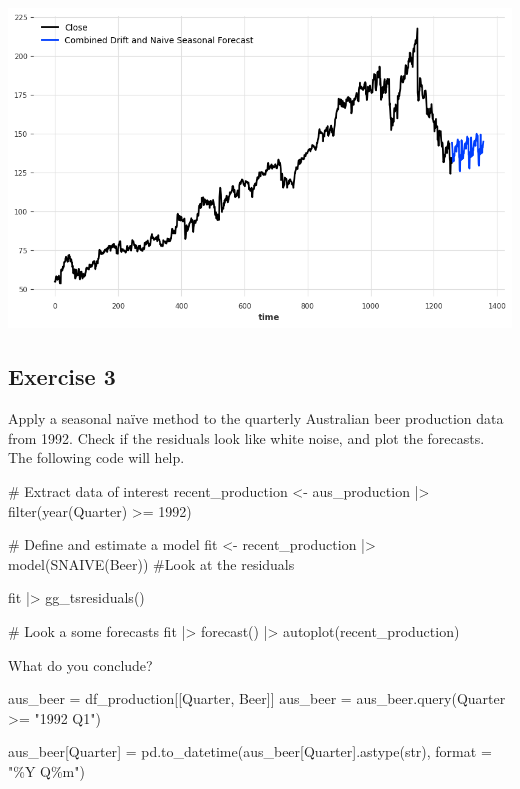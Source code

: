 \documentclass[
  11pt,
]{article}
\newenvironment{Shaded}{\begin{snugshade}}{\end{snugshade}}
\newcommand{\BuiltInTok}[1]{\textcolor[rgb]{0.00,0.23,0.31}{#1}}
\newcommand{\NormalTok}[1]{\textcolor[rgb]{0.00,0.23,0.31}{#1}}
\newcommand{\OperatorTok}[1]{\textcolor[rgb]{0.37,0.37,0.37}{#1}}
\newcommand{\StringTok}[1]{\textcolor[rgb]{0.13,0.47,0.30}{#1}}
\begin{document}
\includegraphics{hw3_files/figure-pdf/cell-32-output-1.png}

\subsection{Exercise 3}\label{exercise-3}

Apply a seasonal naïve method to the quarterly Australian beer
production data from 1992. Check if the residuals look like white noise,
and plot the forecasts. The following code will help.

\begin{Shaded}
\begin{Highlighting}[]
\NormalTok{\# Extract data of interest}
\NormalTok{recent\_production \textless{}{-} aus\_production |\textgreater{}}
\NormalTok{  filter(year(Quarter) \textgreater{}= 1992)}

\NormalTok{\# Define and estimate a model}
\NormalTok{fit \textless{}{-} recent\_production |\textgreater{} model(SNAIVE(Beer))}
\NormalTok{\#Look at the residuals}

\NormalTok{fit |\textgreater{} gg\_tsresiduals()}

\NormalTok{\# Look a some forecasts}
\NormalTok{fit |\textgreater{} forecast() |\textgreater{} autoplot(recent\_production)}
\end{Highlighting}
\end{Shaded}

What do you conclude?

\begin{Shaded}
\begin{Highlighting}[]
\NormalTok{aus\_beer }\OperatorTok{=}\NormalTok{ df\_production[[}\StringTok{\textquotesingle{}Quarter\textquotesingle{}}\NormalTok{, }\StringTok{\textquotesingle{}Beer\textquotesingle{}}\NormalTok{]]}
\NormalTok{aus\_beer }\OperatorTok{=}\NormalTok{ aus\_beer.query(}\StringTok{\textquotesingle{}Quarter \textgreater{}= "1992 Q1"\textquotesingle{}}\NormalTok{)}


\NormalTok{aus\_beer[}\StringTok{\textquotesingle{}Quarter\textquotesingle{}}\NormalTok{] }\OperatorTok{=}\NormalTok{ pd.to\_datetime(aus\_beer[}\StringTok{\textquotesingle{}Quarter\textquotesingle{}}\NormalTok{].astype(}\BuiltInTok{str}\NormalTok{), }\BuiltInTok{format} \OperatorTok{=} \StringTok{"\%Y Q\%m"}\NormalTok{)}
\end{Highlighting}
\end{Shaded}
\end{document}
